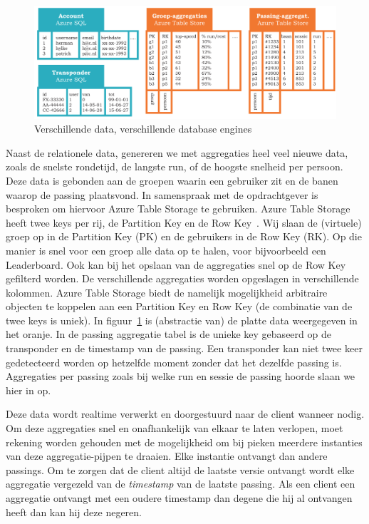 \begin{figure}
\centering
\includegraphics[width=\textwidth]{style/images/DBEngines}
\caption{Verschillende data, verschillende database engines}
\label{fig:dbengines}
\end{figure}

Naast de relationele data, genereren we met aggregaties heel veel nieuwe data, zoals de snelste rondetijd, de langste run, of de hoogste snelheid per persoon. Deze data is gebonden aan de groepen waarin een gebruiker zit en de banen waarop de passing plaatsvond. In samenspraak met de opdrachtgever is besproken om hiervoor Azure Table Storage te gebruiken. Azure Table Storage heeft twee keys per rij, de Partition Key en de Row Key~\cite{azuretablestorage}. Wij slaan de (virtuele) groep op in de Partition Key (PK) en de gebruikers in de Row Key (RK). Op die manier is snel voor een groep alle data op te halen, voor bijvoorbeeld een Leaderboard. Ook kan bij het opslaan van de aggregaties snel op de Row Key gefilterd worden. De verschillende aggregaties worden opgeslagen in verschillende kolommen. Azure Table Storage biedt de namelijk mogelijkheid arbitraire objecten te koppelen aan een Partition Key en Row Key (de combinatie van de twee keys is uniek). In figuur~\ref{fig:dbengines} is (abstractie van) de platte data weergegeven in het oranje. In de passing aggregatie tabel is de unieke key gebaseerd op de transponder en de timestamp van de passing. Een transponder kan niet twee keer gedetecteerd worden op hetzelfde moment zonder dat het dezelfde passing is. Aggregaties per passing zoals bij welke run en sessie de passing hoorde slaan we hier in op.

Deze data wordt realtime verwerkt en doorgestuurd naar de client wanneer nodig. Om deze aggregaties snel en onafhankelijk van elkaar te laten verlopen, moet rekening worden gehouden met de mogelijkheid om bij pieken meerdere instanties van deze aggregatie-pijpen te draaien. Elke instantie ontvangt dan andere passings. Om te zorgen dat de client altijd de laatste versie ontvangt wordt elke aggregatie vergezeld van de \textit{timestamp} van de laatste passing. Als een client een aggregatie ontvangt met een oudere timestamp dan degene die hij al ontvangen heeft dan kan hij deze negeren.


